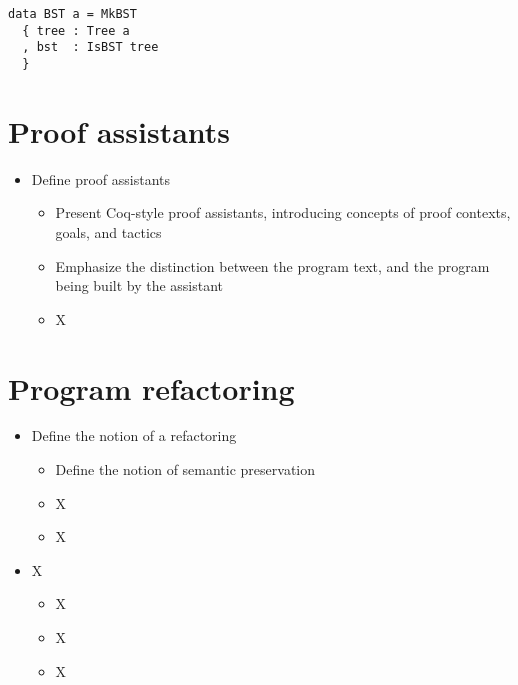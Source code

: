 \begin{verbatim}
data BST a = MkBST
  { tree : Tree a
  , bst  : IsBST tree
  }
\end{verbatim}

\section{Proof assistants}

\begin{itemize}

  \item Define proof assistants

        \begin{itemize}

          \item Present Coq-style proof assistants, introducing concepts of
proof contexts, goals, and tactics

          \item Emphasize the distinction between the program text, and the
program being built by the assistant

          \item X

        \end{itemize}

\end{itemize}

\section{Program refactoring}

\begin{itemize}

  \item Define the notion of a refactoring

        \begin{itemize}

          \item Define the notion of semantic preservation

          \item X

          \item X

        \end{itemize}

  \item X

        \begin{itemize}

          \item X

          \item X

          \item X

        \end{itemize}

\end{itemize}
